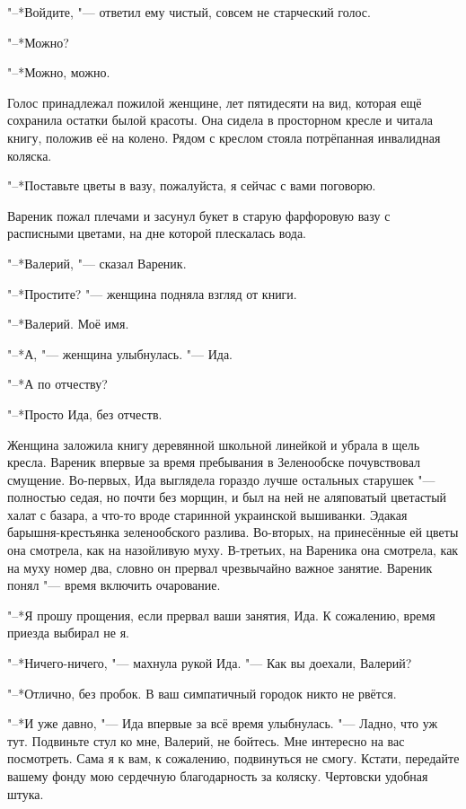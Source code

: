 "--*Войдите, "--- ответил ему чистый, совсем не старческий голос.

\asterism

"--*Можно?

"--*Можно, можно.

Голос принадлежал пожилой женщине, лет пятидесяти на вид, которая ещё сохранила остатки былой красоты.
Она сидела в просторном кресле и читала книгу, положив её на колено.
Рядом с креслом стояла потрёпанная инвалидная коляска.

"--*Поставьте цветы в вазу, пожалуйста, я сейчас с вами поговорю.

Вареник пожал плечами и засунул букет в старую фарфоровую вазу с расписными цветами, на дне которой плескалась вода.

"--*Валерий, "--- сказал Вареник.

"--*Простите? "--- женщина подняла взгляд от книги.

"--*Валерий.
Моё имя.

"--*А, "--- женщина улыбнулась.
"--- Ида.

"--*А по отчеству?

"--*Просто Ида, без отчеств.

Женщина заложила книгу деревянной школьной линейкой и убрала в щель кресла.
Вареник впервые за время пребывания в Зеленообске почувствовал смущение.
Во-первых, Ида выглядела гораздо лучше остальных старушек "--- полностью седая, но почти без морщин, и был на ней не аляповатый цветастый халат с базара, а что-то вроде старинной украинской вышиванки.
Эдакая барышня-крестьянка зеленообского разлива.
Во-вторых, на принесённые ей цветы она смотрела, как на назойливую муху.
В-третьих, на Вареника она смотрела, как на муху номер два, словно он прервал чрезвычайно важное занятие.
Вареник понял "--- время включить очарование.

"--*Я прошу прощения, если прервал ваши занятия, Ида.
К сожалению, время приезда выбирал не я.

"--*Ничего-ничего, "--- махнула рукой Ида.
"--- Как вы доехали, Валерий?

"--*Отлично, без пробок.
В ваш симпатичный городок никто не рвётся.

"--*И уже давно, "--- Ида впервые за всё время улыбнулась.
"--- Ладно, что уж тут.
Подвиньте стул ко мне, Валерий, не бойтесь.
Мне интересно на вас посмотреть.
Сама я к вам, к сожалению, подвинуться не смогу.
Кстати, передайте вашему фонду мою сердечную благодарность за коляску.
Чертовски удобная штука.

